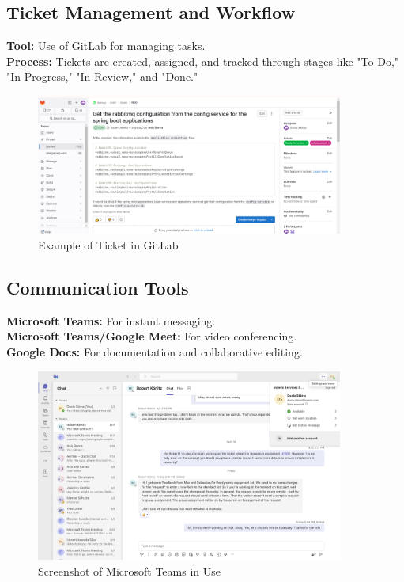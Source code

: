 \subsection{Ticket Management and Workflow}
\textbf{Tool:} Use of GitLab for managing tasks. \\
\textbf{Process:} Tickets are created, assigned, and tracked through stages like "To Do," "In Progress," "In Review," and "Done."
\begin{figure}[H]
    \centering
    \includegraphics[width=0.9\textwidth]{src/assets/chapters/ticket.PNG}
    \caption{Example of Ticket in GitLab}
    \label{fig:ticket_management}
\end{figure}

\subsection{Communication Tools}
\textbf{Microsoft Teams:} For instant messaging. \\
\textbf{Microsoft Teams/Google Meet:} For video conferencing. \\
\textbf{Google Docs:} For documentation and collaborative editing.
\begin{figure}[H]
    \centering
    \includegraphics[width=0.9\textwidth]{src/assets/chapters/MicrosoftTeams.png}
    \caption{Screenshot of Microsoft Teams in Use}
    \label{fig:communication_tools}
\end{figure}

